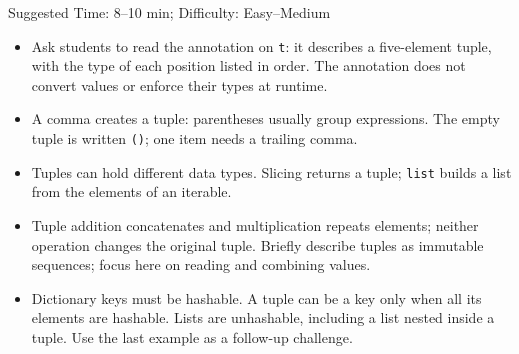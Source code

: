 \begin{questionmeta}
    Suggested Time: 8--10 min; Difficulty: Easy--Medium
    \nopagebreak[4]
\begin{itemize}
        \item Ask students to read the annotation on \lstinline{t}: it describes a five-element tuple, with the type of each position listed in order. The annotation does not convert values or enforce their types at runtime.
        \item A comma creates a tuple: parentheses usually group expressions.
        The empty tuple is written \lstinline{()}; one item needs a trailing comma.
        \item Tuples can hold different data types. Slicing returns a tuple;
        \lstinline{list} builds a list from the elements of an iterable.
        \item Tuple addition concatenates and multiplication repeats elements;
        neither operation changes the original tuple. Briefly describe tuples as immutable sequences; focus here on reading and combining values.
        \item Dictionary keys must be hashable. A tuple can be a key only when
        all its elements are hashable. Lists are unhashable, including a list
        nested inside a tuple. Use the last example as a follow-up challenge.
    \end{itemize}
\end{questionmeta}
